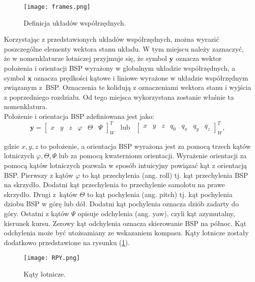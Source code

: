 \begin{figure}[!h]
   	\centering
      	\texttt{[image: frames.png]}
      	\caption{Definicja układów współrzędnych.}
\end{figure}

Korzystając z przedstawionych układów współrzędnych, można wyrazić poszczególne elementy wektora stanu układu. W tym miejscu należy zaznaczyć, że w nomenklaturze lotniczej przyjmuje się, że symbol $\bm{y}$ oznacza wektor położenia i orientacji BSP wyrażony w globalnym układzie współrzędnych, a symbol $\bm{x}$ oznacza prędkości kątowe i liniowe wyrażone w układzie współrzędnym związanym z~BSP. Oznaczenia te kolidują z oznaczeniami wektora stanu i wyjścia z poprzedniego rozdziału. Od tego miejsca wykorzystana zostanie właśnie ta nomenklatura.\\

Położenie i orientacja BSP zdefiniowana jest jako:
\[
	      		 \bm{y} = \begin{bmatrix}x & y &  z & \varphi & \Theta & \Psi  \end{bmatrix}^{T}_{W} \hspace{10pt} \text{lub} \hspace{10pt} \begin{bmatrix}x & y & z & q_0 &  q_x &  q_y & q_z  \end{bmatrix}^{T}_{W},
\]

gdzie $x, y, z$ to położenie, a orientacja BSP wyrażona jest za pomocą trzech kątów lotniczych $\varphi, \Theta,  \Psi$ lub za pomocą kwaternionu orientacji. Wyrażenie orientacji za pomocą kątów lotniczych pozwala w sposób intuicyjny powiązać kąt z orientacją BSP. Pierwszy z kątów $\varphi$ to kąt przechylenia (ang. roll) tj. kąt przechylenia BSP na skrzydło. Dodatni kąt przechylenia to przechylenie samolotu na prawe skrzydło. Drugi z~kątów $\Theta$ to kąt pochylenia (ang. pitch) tj. kąt pochylenia dziobu BSP w górę lub dół. Dodatni kąt pochylenia oznacza dziób zadarty do góry. Ostatni z kątów $\Psi$ opisuje odchylenia (ang. yaw), czyli kąt azymutalny, kierunek kursu. Zerowy kąt odchylenia oznacza skierowanie BSP na północ. Kąt odchylenia może być utożsamiany ze wskazaniem kompasu. Kąty lotnicze zostały dodatkowo przedstawione na rysunku (\ref{RPY}).

\begin{figure}[!h]
   	\centering
      	\texttt{[image: RPY.png]}
      	\caption{Kąty lotnicze.}
      	\label{RPY}
\end{figure}

